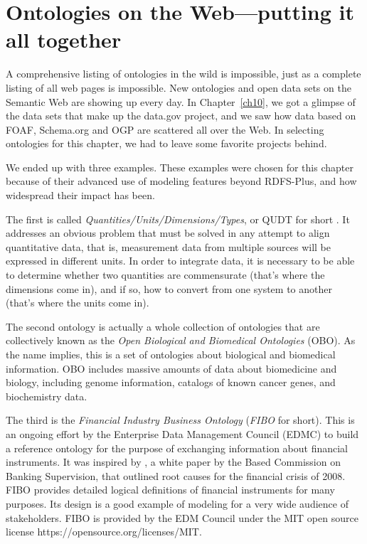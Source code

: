 \chapter{Ontologies on the Web---putting it all together}
\label{ch14}

A comprehensive listing of ontologies in the wild is impossible, just as
a complete listing of all web pages is impossible. New ontologies and
open data sets on the Semantic Web are showing up every day. In Chapter~\ref{ch10}, we got a glimpse of the data sets that make up the data.gov project,
and we saw how data based on FOAF, Schema.org and OGP are scattered all over the
Web. In selecting ontologies for this chapter, we had to leave some
favorite projects behind.

We ended up with three examples. These examples were chosen for this
chapter because of their advanced use of modeling features beyond
RDFS-Plus, and how widespread their impact has been.


The first is called \emph{Quantities/Units/Dimensions/Types}, or QUDT for
short \cite{QUDT}. It addresses an obvious problem that must be solved in any
attempt to align quantitative data, that is, measurement data from
multiple sources will be expressed in different units. In order to
integrate data, it is necessary to be able to determine whether two
quantities are commensurate (that's where the dimensions come in), and
if so, how to convert from one system to another (that's where the units
come in).

The second ontology is actually a whole collection of ontologies that are
collectively known as the \emph{Open Biological and Biomedical Ontologies}
(OBO). As the name implies, this is a set of ontologies about biological
and biomedical information.  OBO includes
massive amounts of data about biomedicine and biology, including genome
information, catalogs of known cancer genes, and biochemistry data.


The third is the \emph{Financial Industry Business Ontology} (\emph{FIBO} for short).
This is an ongoing effort by the Enterprise Data Management Council (EDMC) to 
build a reference ontology for the purpose of exchanging information about 
financial instruments.  It was inspired by
\cite{basel2013principles}, a white paper by the Based Commission 
on Banking Supervision, that outlined root causes for the financial crisis of
2008.  FIBO provides detailed logical definitions of financial instruments
for many purposes.  Its design is a good example of modeling for a very wide
audience of stakeholders.  FIBO is provided by the EDM Council under the MIT open source license https://opensource.org/licenses/MIT. 


